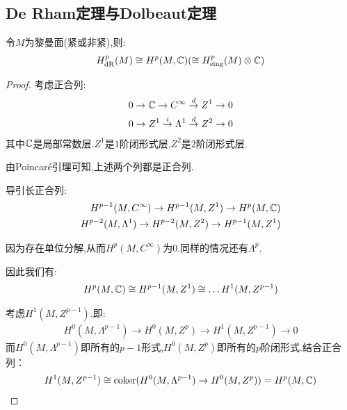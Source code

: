 \subsection*{De Rham定理与Dolbeaut定理}
\begin{theorem}[de Rham定理]
	令$M$为黎曼面(紧或非紧),则:
	\begin{align*}
		H_{\mathrm{dR}}^p(M)\cong H^p(M,\mathbb{C})(\cong H^p_{\mathrm{sing}}(M)\otimes \mathbb{C})
	\end{align*}
\end{theorem}
\begin{proof}
	考虑正合列:
	\begin{align*}
		0 \to \mathbb{C} \to C^\infty \stackrel{d}{\rightarrow} Z^1 \to 0\\
		0 \to Z^1 \stackrel{i}{\rightarrow} \Lambda^1 \stackrel{d}{\rightarrow} Z^2 \to 0 
	\end{align*}
	其中$\mathbb{C}$是局部常数层.$Z^1$是$1$阶闭形式层,$Z^2$是$2$阶闭形式层.

	由Poincar\'{e}引理可知,上述两个列都是正合列.

	导引长正合列:
	\begin{align*}
		H^{p-1}(M,C^\infty) \to H^{p-1}(M,Z^1) \to H^p(M,\mathbb{C})\\
		H^{p-2}(M,\Lambda^1) \to H^{p-2}(M,Z^2) \to H^{p-1}(M,Z^1)\\
	\end{align*}
	
	因为存在单位分解,从而$H^p(M,C^\infty)$为$0$.同样的情况还有$\Lambda^p$.

	因此我们有:
	\begin{align*}
		H^p(M,\mathbb{C})\cong H^{p-1}(M,Z^1) \cong \dots H^1(M,Z^{p-1})
	\end{align*}

	考虑$H^1(M,Z^{p-1})$.即:
	\begin{align*}
		H^0(M,\Lambda^{p-1}) \to H^0(M,Z^p) \to H^1(M,Z^{p-1}) \to 0
	\end{align*}
	而$H^0(M,\Lambda^{p-1})$即所有的$p-1$形式,$H^0(M,Z^p)$即所有的$p$阶闭形式.结合正合列：
	\begin{align*}
		H^1(M,Z^{p-1}) \cong \mathrm{coker}(H^0(M,\Lambda^{p-1}) \to H^0(M,Z^p))=H^p(M,\mathbb{C})
	\end{align*}
\end{proof}
